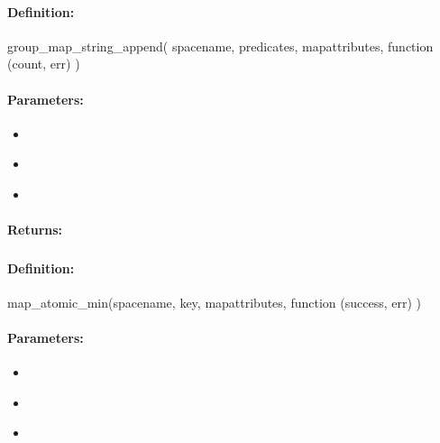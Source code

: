 \paragraph{Definition:}
\begin{javascriptcode}
group_map_string_append(
        spacename, predicates, mapattributes, function (count, err) {})
\end{javascriptcode}
\paragraph{Parameters:}
\begin{itemize}[noitemsep]
\item {}\\

\item {}\\

\item {}\\

\end{itemize}

\paragraph{Returns:}


\pagebreak
\subsubsection{}
\label{api:nodejs:map_atomic_min}


\paragraph{Definition:}
\begin{javascriptcode}
map_atomic_min(spacename, key, mapattributes, function (success, err) {})
\end{javascriptcode}
\paragraph{Parameters:}
\begin{itemize}[noitemsep]
\item {}\\

\item {}\\

\item {}\\

\end{itemize}

